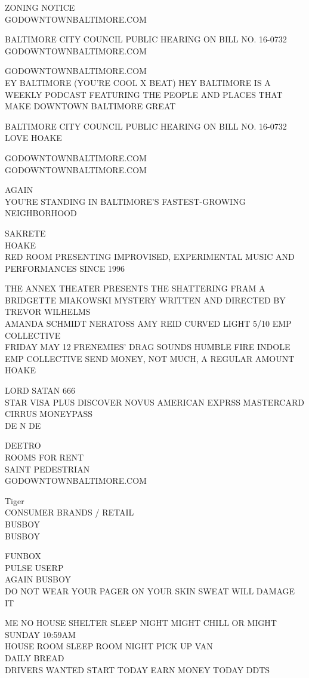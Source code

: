 \documentclass[10pt,letterpaper]{article}
\begin{document}
ZONING NOTICE\\
GODOWNTOWNBALTIMORE.COM

BALTIMORE CITY COUNCIL PUBLIC HEARING ON BILL NO. 16{-}0732\\
GODOWNTOWNBALTIMORE.COM

GODOWNTOWNBALTIMORE.COM\\
EY BALTIMORE (YOU'RE COOL X BEAT) HEY BALTIMORE IS A WEEKLY PODCAST FEATURING THE PEOPLE AND PLACES THAT MAKE DOWNTOWN BALTIMORE GREAT

BALTIMORE CITY COUNCIL PUBLIC HEARING ON BILL NO. 16{-}0732\\
LOVE HOAKE

GODOWNTOWNBALTIMORE.COM\\
GODOWNTOWNBALTIMORE.COM

AGAIN\\
YOU'RE STANDING IN BALTIMORE'S FASTEST{-}GROWING NEIGHBORHOOD

SAKRETE\\
HOAKE\\
RED ROOM PRESENTING IMPROVISED, EXPERIMENTAL MUSIC AND PERFORMANCES SINCE 1996

THE ANNEX THEATER PRESENTS THE SHATTERING FRAM A BRIDGETTE MIAKOWSKI MYSTERY WRITTEN AND DIRECTED BY TREVOR WILHELMS\\
AMANDA SCHMIDT NERATOSS AMY REID CURVED LIGHT 5/10 EMP COLLECTIVE\\
FRIDAY MAY 12 FRENEMIES' DRAG SOUNDS HUMBLE FIRE INDOLE EMP COLLECTIVE SEND MONEY, NOT MUCH, A REGULAR AMOUNT\\
HOAKE

LORD SATAN 666\\
STAR VISA PLUS DISCOVER NOVUS AMERICAN EXPRSS MASTERCARD CIRRUS MONEYPASS\\
DE N DE

DEETRO\\
ROOMS FOR RENT\\
SAINT PEDESTRIAN\\
GODOWNTOWNBALTIMORE.COM

Tiger\\
CONSUMER BRANDS / RETAIL\\
BUSBOY\\
BUSBOY

FUNBOX\\
PULSE USERP\\
AGAIN BUSBOY\\
DO NOT WEAR YOUR PAGER ON YOUR SKIN SWEAT WILL DAMAGE IT

ME NO HOUSE SHELTER SLEEP NIGHT MIGHT CHILL OR MIGHT SUNDAY 10:59AM\\
HOUSE ROOM SLEEP ROOM NIGHT PICK UP VAN\\
DAILY BREAD\\
DRIVERS WANTED START TODAY EARN MONEY TODAY DDTS
\end{document}
